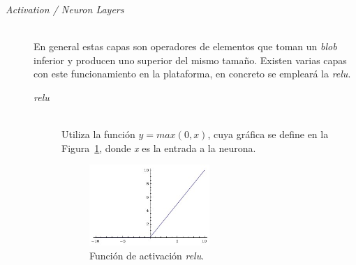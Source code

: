 \begin{description}
\vspace{15pt}	
\item[\textit{Activation / Neuron Layers}] \hfill  
\vspace{10pt}
\\
	En general estas capas son operadores de elementos que toman un \textit{blob} inferior y producen uno superior del mismo tamaño. Existen varias capas con este funcionamiento en la plataforma, en concreto se empleará la \textit{\acrfull{relu}}.
	\vspace{10pt}
	\begin{description}
	\item[\textit{\acrshort{relu}}] \hfill  
	\vspace{5pt}
	\\
		Utiliza la función $y=max(0,x)$, cuya gráfica se define en la Figura~\ref{fig.reLu}, donde \textit{x} es la entrada a la neurona.
		\begin{figure}[H]
			\begin{center}
				\includegraphics[width=0.5\textwidth]{figures/relu.jpeg}
				\caption{Función de activación \textit{\acrshort{relu}}.}
				\label{fig.reLu}
			\end{center}
		\end{figure} 
	\end{description}
	

\end{description}
